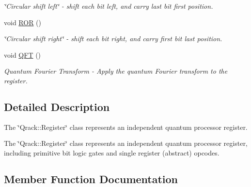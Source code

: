 \begin{DoxyCompactItemize}
\begin{DoxyCompactList}\small\item\em \char`\"{}\+Circular shift left\char`\"{} -\/ shift each bit left, and carry last bit first position. \end{DoxyCompactList}\item 
void \hyperlink{classQrack_1_1Register_ac44e434f628960be0bfc862caa79fe2d}{R\+OR} ()\hypertarget{classQrack_1_1Register_ac44e434f628960be0bfc862caa79fe2d}{}\label{classQrack_1_1Register_ac44e434f628960be0bfc862caa79fe2d}

\begin{DoxyCompactList}\small\item\em \char`\"{}\+Circular shift right\char`\"{} -\/ shift each bit right, and carry first bit last position. \end{DoxyCompactList}\item 
void \hyperlink{classQrack_1_1Register_ac2384de2c947d6b94d844637e90a09a7}{Q\+FT} ()\hypertarget{classQrack_1_1Register_ac2384de2c947d6b94d844637e90a09a7}{}\label{classQrack_1_1Register_ac2384de2c947d6b94d844637e90a09a7}

\begin{DoxyCompactList}\small\item\em Quantum Fourier Transform -\/ Apply the quantum Fourier transform to the register. \end{DoxyCompactList}\end{DoxyCompactItemize}


\subsection{Detailed Description}
The \char`\"{}\+Qrack\+::\+Register\char`\"{} class represents an independent quantum processor register. 

The \char`\"{}\+Qrack\+::\+Register\char`\"{} class represents an independent quantum processor register, including primitive bit logic gates and single register (abstract) opcodes. 

\subsection{Member Function Documentation}

